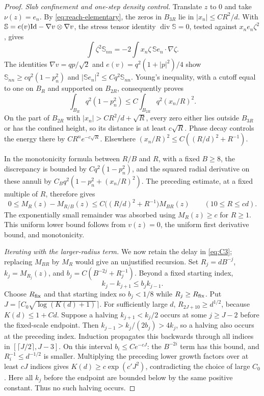 \begin{proof}
\emph{Slab confinement and one-step density control.}
Translate $z$ to $0$ and take $\nu(z)=e_n$.  By
\eqref{eq:reach-elementary}, the zeros in $B_{3R}$ lie in
$|x_n|\le C R^2/d$.  With $\mathbb S=e(v)\mathrm{Id}-\nabla v\otimes\nabla v$,
the stress tensor identity $\operatorname{div}\mathbb S=0$, tested
against $x_ne_n\zeta^2$, gives
\[
 \int\zeta^2\mathbb S_{nn}
 =-2\int x_n\zeta\,\mathbb S e_n\cdot\nabla\zeta.
\]
The identities $\nabla v=qp/\sqrt2$ and
$e(v)=q^2(1+|p|^2)/4$ show
$\mathbb S_{nn}\ge c q^2(1-p_n^2)$ and
$|\mathbb S e_n|^2\le Cq^2\mathbb S_{nn}$.
Young's inequality, with a cutoff equal to one on $B_R$ and
supported on $B_{2R}$, consequently proves
\[
 \int_{B_R}q^2(1-p_n^2)
 \le C\int_{B_{2R}}q^2(x_n/R)^2.
\]
On the part of $B_{2R}$ with
$|x_n|>CR^2/d+\sqrt R$, every zero either lies outside $B_{3R}$
or has the confined height, so its distance is at least $c\sqrt R$.
Phase decay controls the energy there by $C R^n e^{-c\sqrt R}$.
Elsewhere $(x_n/R)^2\le C((R/d)^2+R^{-1})$.

In the monotonicity formula between $R/B$ and $R$, with a fixed
$B\ge8$, the discrepancy is bounded by $Cq^2(1-p_n^2)$, and the
squared radial derivative on these annuli by
$C_Bq^2(1-p_n^2+(x_n/R)^2)$.  The preceding estimate, at a fixed
multiple of $R$, therefore gives
\begin{equation}\label{eq:C3}
 0\le M_R(z)-M_{R/B}(z)
 \le C\bigl((R/d)^2+R^{-1}\bigr)M_{BR}(z)
 \qquad(10\le R\le c d).
\end{equation}
The exponentially small remainder was absorbed using $M_R(z)\ge c$
for $R\ge1$.  This uniform lower bound follows from $v(z)=0$,
the uniform first derivative bound, and monotonicity.

\emph{Iterating with the larger-radius term.}
We now retain the delay in \eqref{eq:C3}; replacing $M_{BR}$ by
$M_R$ would give an unjustified recursion.
Set $R_j=dB^{-j}$, $k_j=M_{R_j}(z)$, and
$b_j=C(B^{-2j}+R_j^{-1})$.  Beyond a fixed starting index,
\[
 k_j-k_{j+1}\le b_jk_{j-1}.
\]
Choose $R_{\rm fix}$ and that starting index so $b_j<1/8$ while
$R_j\ge R_{\rm fix}$.  Put
$J=\lceil C_0\sqrt{\log(K(d)+1)}\rceil$.
For sufficiently large $d$, $R_{2J+10}\ge d^{1/2}$, because
$K(d)\le1+Cd$.  Suppose a halving $k_{j+1}<k_j/2$ occurs at some
$j\ge J-2$ before the fixed-scale endpoint.  Then
$k_{j-1}>k_j/(2b_j)>4k_j$, so a halving also occurs at the preceding
index.  Induction propagates this backwards through all indices in
$[\lceil J/2\rceil,J-3]$.  On this interval
$b_i\le C e^{-cJ}$: the $B^{-2i}$ term has this bound, and
$R_i^{-1}\le d^{-1/2}$ is smaller.  Multiplying the preceding lower
growth factors over at least $cJ$ indices gives
$K(d)\ge c\exp(c'J^2)$, contradicting the choice of large $C_0$.
Here all $k_j$ before the endpoint are bounded below by the same
positive constant.  Thus no such halving occurs.


\end{proof}
